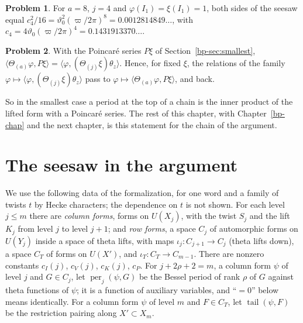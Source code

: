 \documentclass[reqno]{amsart}
\newcounter{chap}
\theoremstyle{definition}
\newtheorem{problem}{Problem}[section]
\theoremstyle{plain}
\theoremstyle{remark}
\newcommand{\per}{\operatorname{per}}
\newcommand{\tail}{\operatorname{tail}}
\begin{document}
\begin{problem}\label{pr:value}
For \(a=8\), \(j=4\) and \(\varphi(I_1)=\xi(I_1)=1\), both sides of the seesaw equal \(c_4^2/16=\vartheta_0^2(\varpi/2\pi)^8=0.0012814849\ldots\), with \(c_4=4\vartheta_0(\varpi/2\pi)^4=0.1431913370\ldots\).
\end{problem}

\begin{problem}\label{pr:toy-chain}
With the Poincar\'e series \(P\xi\) of Section~\ref{bp-sec:smallest}, \(\langle\Theta_{(a)}\varphi,P\xi\rangle=\langle\varphi,(\Theta_{(j)}\xi)\theta_z\rangle\).  Hence, for fixed \(\xi\), the relations of the family \(\varphi\mapsto\langle\varphi,(\Theta_{(j)}\xi)\theta_z\rangle\) pass to \(\varphi\mapsto\langle\Theta_{(a)}\varphi,P\xi\rangle\), and back.
\end{problem}

So in the smallest case a period at the top of a chain is the inner product of the lifted form with a Poincar\'e series.  The rest of this chapter, with Chapter~\ref{bp-chap} and the next chapter, is this statement for the chain of the argument.

\section{The seesaw in the argument}\label{sec:steps}

We use the following data of the formalization, for one word and a family of twists \(t\) by Hecke characters; the dependence on \(t\) is not shown.  For each level \(j\le m\) there are \emph{column forms}, forms on \(U(X_j)\), with the twist \(S_j\) and the lift \(K_j\) from level \(j\) to level \(j+1\); and \emph{row forms}, a space \(C_j\) of automorphic forms on \(U(Y_j)\) inside a space of theta lifts, with maps \(\iota_j\colon C_{j+1}\to C_j\) (theta lifts down), a space \(C_T\) of forms on \(U(X')\), and \(\iota_T\colon C_T\to C_{m-1}\).  There are nonzero constants \(c_I(j)\), \(c_V(j)\), \(c_K(j)\), \(c_P\).  For \(j+2\rho+2=m\), a column form \(\psi\) of level \(j\) and \(G\in C_j\), let \(\per_j(\psi,G)\) be the Bessel period of rank \(\rho\) of \(G\) against theta functions of \(\psi\); it is a function of auxiliary variables, and ``\(=0\)'' below means identically.  For a column form \(\psi\) of level \(m\) and \(F\in C_T\), let \(\tail(\psi,F)\) be the restriction pairing along \(X'\subset X_m\).
\end{document}
